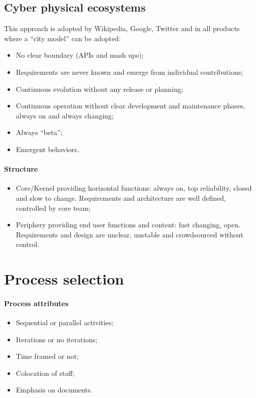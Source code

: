\subsection{Cyber physical ecosystems}
This approach is adopted by Wikipedia, Google, Twitter and in all products where a ``city model'' can be adopted:
\begin{itemize}
\item No clear boundary (APIs and mash ups);
\item Requirements are never known and emerge from individual contributions;
\item Continuous evolution without any release or planning;
\item Continuous operation without clear development and maintenance phases, always on and always changing;
\item Always ``beta'';
\item Emergent behaviors.
\end{itemize}

\paragraph{Structure}
\begin{itemize}
\item Core/Kernel providing horizontal functions: always on, top reliability, closed and slow to change. Requirements and architecture are well defined, controlled by core team; 
\item Periphery providing end user functions and content: fast changing, open. Requirements and design are unclear, unstable and crowdsourced without control.
\end{itemize}

\section{Process selection}
\paragraph{Process attributes}
\begin{itemize}
\item Sequential or parallel activities;
\item Iterations or no iterations;
\item Time framed or not;
\item Colocation of staff;
\item Emphasis on documents.
\end{itemize}

